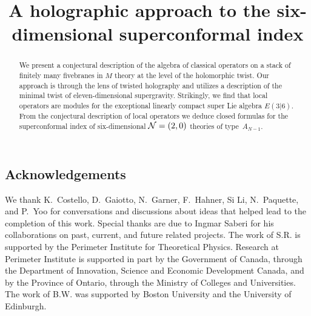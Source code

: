 \documentclass[11pt]{amsart}
\begin{document}
\title{A holographic approach to the six-dimensional superconformal index}
\maketitle

\begin{abstract}
We present a conjectural description of the algebra of classical operators on a stack of finitely many fivebranes in $M$ theory at the level of the holomorphic twist.
Our approach is through the lens of twisted holography and utilizes a description of the minimal twist of eleven-dimensional supergravity. 
Strikingly, we find that local operators are modules for the exceptional linearly compact super Lie algebra $E(3|6)$. From the conjectural description of local operators we deduce closed formulas for the superconformal index of six-dimensional $\mathcal N=(2,0)$ theories of type~$A_{N-1}$.
\end{abstract}

\setcounter{tocdepth}{1}
\tableofcontents



\subsection*{Acknowledgements}
We thank K.~Costello, D.~Gaiotto, N.~Garner, F.~Hahner, Si Li, N.~Paquette, and P.~Yoo for conversations and discussions about ideas that helped lead to the completion of this work. 
Special thanks are due to Ingmar Saberi for his collaborations on past, current, and future related projects.
The work of S.R. is supported by the Perimeter Institute for Theoretical Physics. Research at Perimeter Institute is supported in part by the Government of Canada, through the Department of Innovation, Science and Economic Development Canada, and by the Province of Ontario, through the Ministry of Colleges and Universities.
The work of B.W. was supported by Boston University and the University of Edinburgh. 








 




\printbibliography
\end{document}
